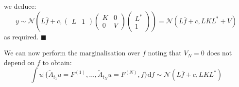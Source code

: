 \documentclass{article}
\renewcommand\qedsymbol{$\blacksquare$}
\theoremstyle{definition}
\theoremstyle{remark}
\theoremstyle{remark}
\begin{document}
we deduce:
\begin{equation*}
    y\sim\mathcal{N}\left(L\bar{f}+c, \begin{pmatrix}
        L & 1
    \end{pmatrix}\begin{pmatrix}
                    K & 0 \\
                    0 & V
                \end{pmatrix}\begin{pmatrix}
                    L^{*} \\
                    1
                \end{pmatrix}\right)=\mathcal{N}(L\bar{f}+c,LKL^{*}+V)
\end{equation*}
as required. \qedsymbol

\noindent We can now perform the marginalisation over $f$ noting that $V_N=0$ does not depend on $f$ to obtain:
\begin{equation}
    \int u|\{\tilde{A}_{t_1}u=F^{(1)},\dots,\tilde{A}_{t_N}u=F^{(N)},f\}\mathrm{d}f\sim\mathcal{N}(L\bar{f}+c,LKL^{*})
\end{equation}
%
%
\end{document}

